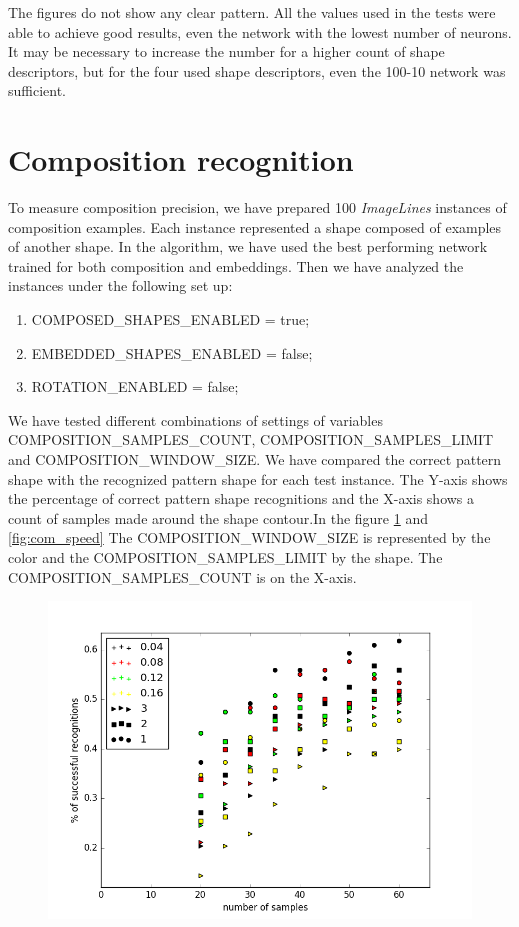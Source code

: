 \begin{description}
The figures do not show any clear pattern. All the values used in the tests were able to achieve good results, even the network with the lowest number of neurons. It may be necessary to increase the number for a higher count of shape descriptors, but for the four used shape descriptors, even the 100-10 network was sufficient.

\section{Composition recognition}
To measure composition precision, we have prepared 100 \emph{ImageLines} instances of composition examples. Each instance represented a shape composed of examples of another shape. In the algorithm, we have used the best performing network trained for both composition and embeddings. Then we have analyzed the instances under the following set up:
\begin{enumerate}
\item COMPOSED\_SHAPES\_ENABLED = true;
\item EMBEDDED\_SHAPES\_ENABLED = false;
\item ROTATION\_ENABLED = false;
\end{enumerate}
We have tested different combinations of settings of variables COMPOSITION\_SAMPLES\_COUNT, COMPOSITION\_SAMPLES\_LIMIT and COMPOSITION\_WINDOW\_SIZE. We have compared the correct pattern shape with the recognized pattern shape for each test instance. The Y-axis shows the percentage of correct pattern shape recognitions and the X-axis shows a count of samples made around the shape contour.In the figure \ref{fig:com} and \ref{fig:com_speed} The COMPOSITION\_WINDOW\_SIZE is represented by the color and the COMPOSITION\_SAMPLES\_LIMIT by the shape. The COMPOSITION\_SAMPLES\_COUNT is on the X-axis. 
\begin{figure}[!htb]
\begin{center}
\label{fig:com}
\includegraphics[width=\linewidth]{ext/figure_composition.png}

\end{center}
\end{figure}
\end{description}
